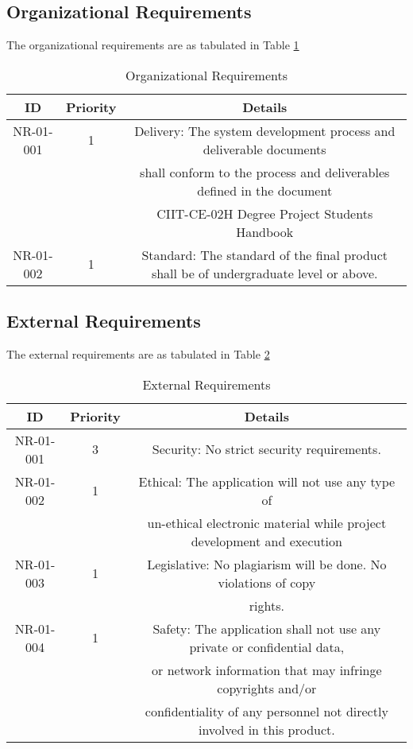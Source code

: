 \documentclass[14pt]{report}
\begin{document}
\subsection{\textbf{Organizational Requirements}}

The organizational requirements are as tabulated in Table \ref{table:3.2}

\begin{table}[H]
\begin{center}
\begin{tabular}{ | c | c | c | }
\hline
 ID & Priority & Details \\ 
\hline
 NR-01-001 & 1 & Delivery: The system development process and deliverable documents\\ 
     &     &    shall conform to the process and deliverables defined in the document\\ 
     &     &    CIIT-CE-02H Degree Project Students Handbook \\ \hline
 NR-01-002 & 1 & Standard: The standard of the final product shall be of undergraduate level or above. \\  
\hline
\end{tabular}
\end{center}
\caption{Organizational Requirements}
\label{table:3.2}
\end{table}

\subsection{\textbf{External Requirements}}

The external requirements are as tabulated in Table \ref{table:3.3}

\begin{table}[H]
\begin{center}
\begin{tabular}{ | c | c | c | }
\hline
 ID & Priority & Details \\ 
\hline
 NR-01-001 & 3 &Security: No strict security requirements. \\ \hline
 NR-01-002 & 1 &Ethical: The application will not use any type of  \\
     &     &    un-ethical electronic material while project development and execution\\   \hline
NR-01-003 & 1 &Legislative: No plagiarism will be done. No violations of copy \\  
     &     &    rights.\\ \hline
NR-01-004 & 1 & Safety: The application shall not use any private or confidential data,  \\    
     &     &    or network information that may infringe copyrights and/or\\ 
     &     &    confidentiality of any personnel not directly involved in this product. \\ \hline
\end{tabular}
\end{center}
\caption{External Requirements}
\label{table:3.3}
\end{table}
\end{document}
